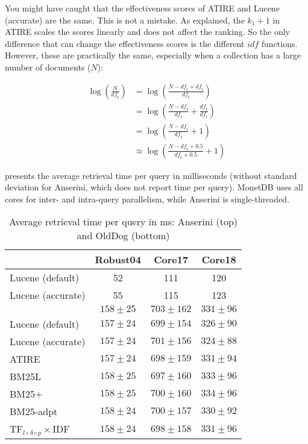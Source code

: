 You might have caught that the effectiveness scores of ATIRE and Lucene (accurate) are the same. This is not a mistake. As explained, the $k_1+1$ in ATIRE scales the scores linearly and does not affect the ranking. So the only difference that can change the effectiveness scores is the different $\mathit{idf}$ functions. However, these are practically the same, especially when a collection has a large number of documents ($N$):

\begin{align}
	\log\left(\frac{N}{\mathit{df}_t}\right) &= \log\left(\frac{N-\mathit{df}_t+\mathit{df}_t}{\mathit{df}_t}\right) \\
	&= \log\left(\frac{N-\mathit{df}_t}{\mathit{df}_t} + \frac{\mathit{df}_t}{\mathit{df}_t}\right) \\
	&= \log\left(\frac{N-\mathit{df}_t}{\mathit{df}_t} + 1\right) \\
	&\approx \log\left(\frac{N-\mathit{df}_t+0.5}{\mathit{df}_t+0.5} + 1\right)
\end{align}

 presents the average retrieval time per query in milliseconds (without standard deviation for Anserini, which does not report time per query). MonetDB uses all cores for inter- and intra-query parallelism, while Anserini is single-threaded.

\begin{table}
	\centering
	\caption{Average retrieval time per query in ms: Anserini (top) and OldDog (bottom)}
	\label{bm25_effiency}
	\begin{tabular}{l | c c c}
		\toprule
		&Robust04&Core17&Core18\\
		\midrule
		Lucene (default)&52&111&120\\
		Lucene (accurate)&55&115&123\\
		\midrule
		\citeauthor{bm25-robertson}&$158\pm25$&$703\pm162$&$331\pm96$\\
		Lucene (default)&$157\pm24$&$699\pm154$&$326\pm90$\\
		Lucene (accurate)&$157\pm24$&$701\pm156$&$324\pm88$\\
		ATIRE&$157\pm24$&$698\pm159$&$331\pm94$\\
		BM25L&$158\pm25$&$697\pm160$&$333\pm96$\\
		BM25+&$158\pm25$&$700\pm160$&$334\pm96$\\
		BM25-adpt&$158\pm24$&$700\pm157$&$330\pm92$\\
		TF$_{l\circ\delta\circ p}\times$IDF&$158\pm24$&$698\pm158$&$331\pm96$ \\
		\bottomrule
	\end{tabular}
\end{table}

